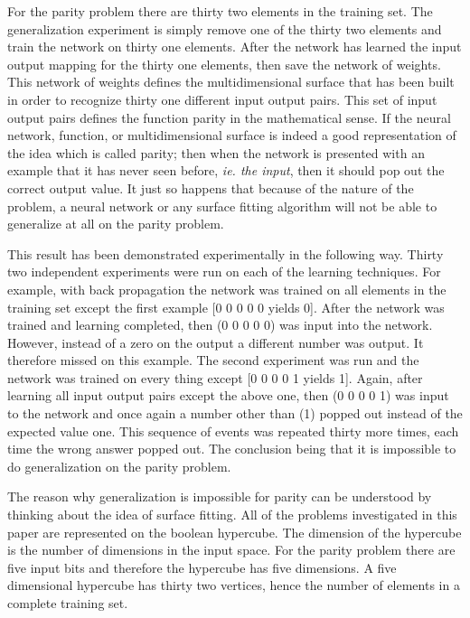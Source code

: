 	For the parity problem there are thirty two elements in the
training set.  The generalization experiment is simply remove one of
the thirty two elements	and train the network on thirty one elements.
After the network has learned the input output mapping for the thirty
one elements, then save the network of weights.  This network of
weights defines the multidimensional surface that has been built in
order to recognize thirty one different input output pairs.  This set
of input output pairs defines the function parity in the mathematical
sense.  If the neural network, function, or multidimensional surface
is indeed a good representation of the idea which is called parity;
then when the network is presented with an example that it has never
seen before, {\it ie. the input}, then it should pop out the correct
output value.  It just so happens that because of the nature of the
problem, a neural network or any surface fitting algorithm will not be
able to generalize at all on the parity problem.

	This result has been demonstrated experimentally in the
following way.  Thirty two independent experiments were run on each of
the learning techniques.  For example, with back propagation the
network was trained on all elements in the training set except the
first example [0 0 0 0 0 yields 0].  After the network was trained and
learning completed, then (0 0 0 0 0) was input into the network.
However, instead of a zero on the output a different number was
output.  It therefore missed on this example.  The second experiment
was run and the network was trained on every thing except [0 0 0 0 1
yields 1].  Again, after learning all input output pairs except the
above one, then (0 0 0 0 1) was input to the network and once again a
number other than (1) popped out instead of the expected value one.
This sequence of events was repeated thirty more times, each time the
wrong answer popped out.  The conclusion being that it is impossible
to do generalization on the parity problem.

	The reason why generalization is impossible for parity can be
understood by thinking about the idea of surface fitting.  All of the
problems investigated in this paper are represented on the boolean
hypercube.  The dimension of the hypercube is the number of dimensions
in the input space.  For the parity problem there are five input bits
and therefore the hypercube has five dimensions.  A five dimensional
hypercube has thirty two vertices, hence the number of elements in a
complete training set.

